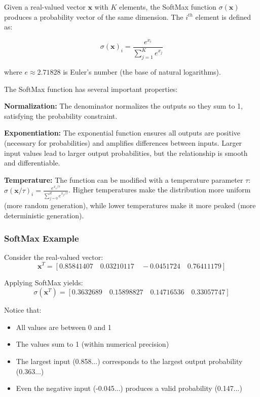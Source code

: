 \documentclass{book}
\begin{document}
Given a real-valued vector $\mathbf{x}$ with $K$ elements, the SoftMax function $\sigma(\mathbf{x})$ produces a probability vector of the same dimension. The $i^{th}$ element is defined as:

\begin{equation}
\sigma(\mathbf{x})_i = \frac{e^{x_i}}{\sum_{j=1}^{K} e^{x_j}}
\end{equation}

where $e \approx 2.71828$ is Euler's number (the base of natural logarithms).

The SoftMax function has several important properties:

\textbf{Normalization:} The denominator normalizes the outputs so they sum to 1, satisfying the probability constraint.

\textbf{Exponentiation:} The exponential function ensures all outputs are positive (necessary for probabilities) and amplifies differences between inputs. Larger input values lead to larger output probabilities, but the relationship is smooth and differentiable.

\textbf{Temperature:} The function can be modified with a temperature parameter $\tau$: $\sigma(\mathbf{x}/\tau)_i = \frac{e^{x_i/\tau}}{\sum_{j=0}^{d} e^{x_j/\tau}}$. Higher temperatures make the distribution more uniform (more random generation), while lower temperatures make it more peaked (more deterministic generation).

\subsubsection{SoftMax Example}

Consider the real-valued vector:
\begin{equation}
\mathbf{x}^T = [0.85841407 \quad 0.03210117 \quad -0.0451724 \quad 0.76411179]
\end{equation}

Applying SoftMax yields:
\begin{equation}
\sigma(\mathbf{x}^T) = [0.3632689 \quad 0.15898827 \quad 0.14716536 \quad 0.33057747]
\end{equation}

Notice that:
\begin{itemize}
\item All values are between 0 and 1
\item The values sum to 1 (within numerical precision)
\item The largest input (0.858...) corresponds to the largest output probability (0.363...)
\item Even the negative input (-0.045...) produces a valid probability (0.147...)
\end{itemize}
\end{document}
